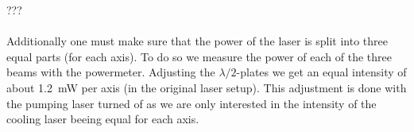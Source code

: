 ???\\ \\

Additionally one must make sure that the power of the laser is split into three equal parts (for each axis). To do so we measure the power of each of the three beams with the powermeter. Adjusting the $\lambda/2$-plates we get an equal intensity of about \SI{1.2}{\milli\watt} per axis (in the original laser setup). This adjustment is done with the pumping laser turned of as we are only interested in the intensity of the cooling laser beeing equal for each axis. 
